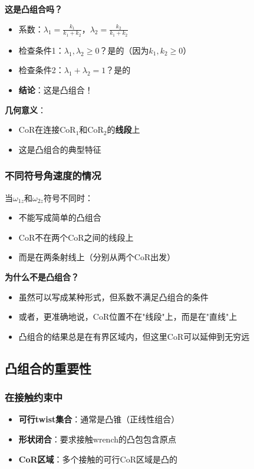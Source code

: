 \documentclass[12pt,a4paper]{article}
\begin{document}
\textbf{这是凸组合吗？}

\begin{itemize}
\item 系数：$\lambda_1 = \frac{k_1}{k_1 + k_2}$，$\lambda_2 = \frac{k_2}{k_1 + k_2}$
\item 检查条件1：$\lambda_1, \lambda_2 \geq 0$？是的（因为$k_1, k_2 \geq 0$）
\item 检查条件2：$\lambda_1 + \lambda_2 = 1$？是的
\item \textbf{结论}：这是凸组合！
\end{itemize}

\textbf{几何意义}：
\begin{itemize}
\item CoR在连接CoR$_1$和CoR$_2$的\textbf{线段}上
\item 这是凸组合的典型特征
\end{itemize}

\subsubsection{不同符号角速度的情况}

当$\omega_{1z}$和$\omega_{2z}$符号不同时：
\begin{itemize}
\item 不能写成简单的凸组合
\item CoR不在两个CoR之间的线段上
\item 而是在两条射线上（分别从两个CoR出发）
\end{itemize}

\textbf{为什么不是凸组合？}

\begin{itemize}
\item 虽然可以写成某种形式，但系数不满足凸组合的条件
\item 或者，更准确地说，CoR位置不在"线段"上，而是在"直线"上
\item 凸组合的结果总是在有界区域内，但这里CoR可以延伸到无穷远
\end{itemize}

\subsection{凸组合的重要性}

\subsubsection{在接触约束中}

\begin{itemize}
\item \textbf{可行twist集合}：通常是凸锥（正线性组合）
\item \textbf{形状闭合}：要求接触wrench的凸包包含原点
\item \textbf{CoR区域}：多个接触的可行CoR区域是凸的
\end{itemize}
\end{document}
